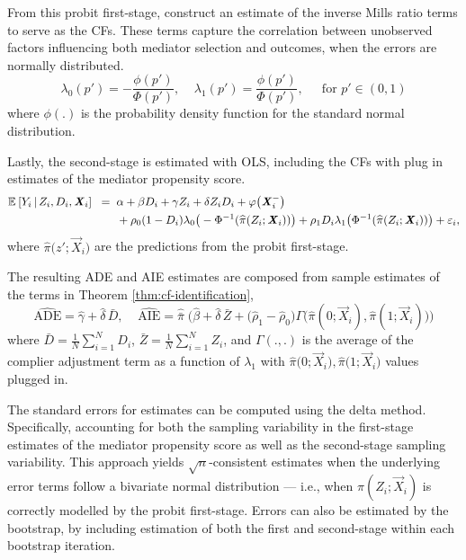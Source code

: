 From this probit first-stage, construct an estimate of the inverse Mills ratio terms to serve as the CFs.
These terms capture the correlation between unobserved factors influencing both mediator selection and outcomes, when the errors are normally distributed.
\[ \lambda_0(p') = - \frac{\phi(p')}{\Phi(p')}, \;\;\;\;
\lambda_1(p') = \frac{\phi(p')}{\Phi(p')}, \;\;\;\; \text{ for } p' \in (0,1) \]
where $\phi(.)$ is the probability density function for the standard normal distribution.

Lastly, the second-stage is estimated with OLS, including the CFs with plug in estimates of the mediator propensity score.
\begin{align*}
    \mathbb{E}_{} \left[ Y_i \, \middle\vert \, Z_i, D_i, \boldsymbol{\mathit{X}}_i \right] \;\; =& \;\;
        \alpha
        + \beta D_i
        + \gamma Z_i
        + \delta Z_i D_i
        + \varphi\big(\boldsymbol{\mathit{X}}_i^-\big) \\
        & \;\; + \rho_0 (1 - D_i) \lambda_0 \big( -\Phi^{-1}(\widehat{\pi}(Z_i; \boldsymbol{\mathit{X}}_i)) \big)
    + \rho_1 D_i \lambda_1\big( \Phi^{-1}(\widehat{\pi}(Z_i; \boldsymbol{\mathit{X}}_i)) \big)
    + \varepsilon_i,
\end{align*}
where $\hat\pi \big(z';\vec X_i \big)$ are the predictions from the probit first-stage.

The resulting ADE and AIE estimates are composed from sample estimates of the terms in Theorem \ref{thm:cf-identification},
\[ \hat{\text{ADE}}
    = \hat{\gamma} + \hat{\delta}\,\bar D, \;\;\;\;
    \hat{\text{AIE}}
    = \hat{\bar\pi}\; \Big(
        \hat{\beta} + \hat{\delta}\,\bar Z
        + \big(\hat \rho_1 - \hat \rho_0 \big)
        \Gamma \big( \hat\pi(0;\vec X_i), \hat\pi(1;\vec X_i)\big) \Big) \]
where $\bar D = \frac1N \sum_{i=1}^N D_i$, $\bar Z = \frac1N \sum_{i=1}^N Z_i$, and $\Gamma(.,.)$ is the average of the complier adjustment term as a function of $\lambda_1$ with $\hat\pi \big(0; \vec X_i \big), \hat\pi \big(1; \vec X_i \big)$ values plugged in.

The standard errors for estimates can be computed using the delta method.
Specifically, accounting for both the sampling variability in the first-stage estimates of the mediator propensity score as well as the second-stage sampling variability.
This approach yields $\sqrt{n}$-consistent estimates when the underlying error terms follow a bivariate normal distribution --- i.e., when $\pi(Z_i; \vec X_i)$ is correctly modelled by the probit first-stage.
Errors can also be estimated by the bootstrap, by including estimation of both the first and second-stage within each bootstrap iteration.

